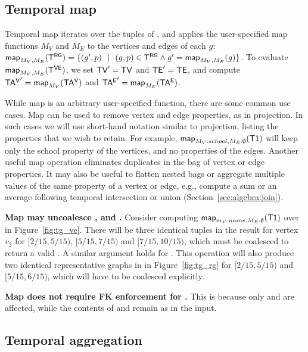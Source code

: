 \subsection{Temporal map}
\label{sec:algebra:project}

Temporal map iterates over the tuples of \trg, and applies the
user-specified map functions $M_V$ and $M_E$ to the vertices and edges
of each $g$: $\textsf{map}_{M_V,M_E} (\mathsf{T^{RG}}) = \{(g', p)~~|~~(g,p) \in \mathsf{T^{RG}}
\wedge g'= \textsf{map}_{M_V,M_E}(g)\}$.  To evaluate $\textsf{map}_{M_V,M_E} (\mathsf{T^{VE}})$,
we set $\textsf{TV}'=\textsf{TV}$ and $\textsf{TE}'=\textsf{TE}$, and compute $\mathsf{TA^{V}}' =
\textsf{map}_{M_V}(\mathsf{TA^{V}})$ and $\mathsf{TA^{E}}' = \textsf{map}_{M_E}(\mathsf{TA^{E}})$.

While map is an arbitrary user-specified function, there are some
common use cases.  Map can be used to remove vertex and edge
properties, as in projection.  In such cases we will use short-hand
notation similar to projection, listing the properties that we wish to
retain. For example, $\textsf{map}_{M_V:{school},M_E:\emptyset} (\textsf{T1})$
will keep only the school property of the vertices, and no properties
of the edges.  Another useful map operation eliminates duplicates in
the bag of vertex or edge properties.  It may also be
useful to flatten nested bags or aggregate multiple values of the same
property of a vertex or edge, e.g., compute a sum or an average
following temporal intersection or union
(Section~\ref{sec:algebra:join}).

{\bf Map may uncoalesce \tav, \tae and \trg.}  Consider computing
$\textsf{map}_{m_V:name, M_E:\emptyset} (\textsf{T1})$ over  in
Figure~\ref{fig:tg_ve}.  There will be three identical tuples in the
result for vertex $v_2$ for $[2/15, 5/15)$, $[5/15, 7/15)$ and $[7/15,
      10/15)$, which must be coalesced to return a valid \tav.  A
      similar argument holds for \tae. This operation will also
      produce two identical representative graphs in \trg in
      Figure~\ref{fig:tg_rg} for $[2/15, 5/15)$ and $[5/15, 6/15)$,
          which will have to be coalesced explicitly.

{\bf Map does not require FK enforcement for \tve.}  This is because
only \tav and \tae are affected, while the contents of \tv and \te
remain as in the input.

\subsection{Temporal aggregation}
\label{sec:algebra:agg}

